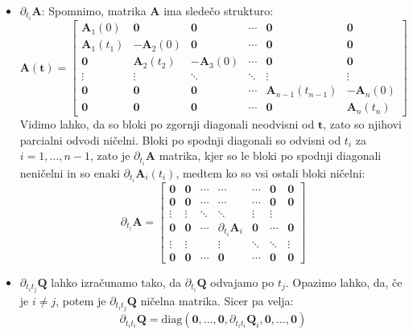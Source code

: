 \documentclass[isrm2, tisk]{fmfdelo}
\newcommand{\qmat}{\mathbf{Q}}
\newcommand{\amat}{\mathbf{A}}
\newcommand{\tvec}{\mathbf{t}}
\begin{document}
\begin{itemize}
\item $\partial_{t_i} \amat$:
Spomnimo, matrika $\amat$ ima sledečo strukturo:
\begin{equation}
    \amat(\tvec) = 
    \begin{bmatrix}
    \amat_1(0) & \mathbf{0} & \mathbf{0} & \cdots & \mathbf{0} & \mathbf{0} \\
    \amat_1(t_1) & -\amat_2(0) & \mathbf{0} & \cdots & \mathbf{0} & \mathbf{0} \\
    \mathbf{0} & \amat_2(t_2) & - \amat_3(0) & \cdots & \mathbf{0} & \mathbf{0} \\
    \vdots & \vdots & \ddots & \ddots & \vdots & \vdots \\
    \mathbf{0} & \mathbf{0} & \mathbf{0} &\cdots & \amat_{n-1}(t_{n-1}) & -\amat_n(0) \\
    \mathbf{0} & \mathbf{0} & \mathbf{0} &\cdots & \mathbf{0} & \amat_n(t_n)
    \end{bmatrix}
\end{equation}
Vidimo lahko, da so bloki po zgornji diagonali neodvisni od $\tvec$, zato so njihovi parcialni odvodi ničelni. Bloki po spodnji diagonali so odvisni od $t_i$ za $i=1,\ldots,n-1$, zato je $\partial_{t_i} \amat$ matrika, kjer so le bloki po spodnji diagonali neničelni in so enaki $\partial_{t_i} \amat_i(t_i)$, medtem ko so vsi ostali bloki ničelni:
\begin{equation}
    \partial_{t_i} \amat =
    \begin{bmatrix}
    \mathbf{0} & \mathbf{0} & \cdots & \cdots & \cdots & \mathbf{0} & \mathbf{0} \\
    \mathbf{0} & \mathbf{0} & \cdots & \cdots & \cdots & \mathbf{0} & \mathbf{0} \\
    \vdots & \vdots & \ddots & \ddots & \vdots & \vdots \\
    \mathbf{0} & \mathbf{0} & \cdots & \partial_{t_i} \amat_i & \mathbf{0} & \cdots & \mathbf{0} \\
    \vdots & \vdots & & \vdots & \ddots & \ddots & \vdots \\
    \mathbf{0} & \mathbf{0} &\cdots & \mathbf{0} & \cdots & \mathbf{0} & \mathbf{0}
    \end{bmatrix}
\end{equation}

\item $\partial_{t_it_j}\qmat$ lahko izračunamo tako, da $\partial_{t_i} \qmat$ odvajamo po $t_j$. Opazimo lahko, da, če je $i \neq j$, potem je $\partial_{t_it_j}\qmat$ ničelna matrika. Sicer pa velja:
\begin{equation}
    \partial_{t_it_i} \mathbf{Q} = \text{diag}(\mathbf{0}, \ldots, \mathbf{0}, \partial_{t_it_i} \qmat_i, \mathbf{0}, \ldots, \mathbf{0})
\end{equation}


\end{itemize}
\end{document}
